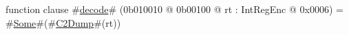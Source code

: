 function clause #\hyperref[sailMIPSzdecode]{decode}# (0b010010 @ 0b00100 @ rt : IntRegEnc @ 0x0006) = #\hyperref[sailMIPSzSome]{Some}#(#\hyperref[sailMIPSzC2Dump]{C2Dump}#(rt))
